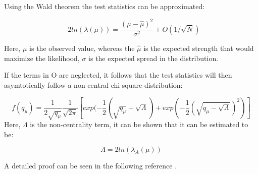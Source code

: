 Using the Wald theorem the test statistics can be approximated: 

\begin{equation}
-2ln(\lambda(\mu))= \frac{(\mu- \hat{\mu})^{2}}{\sigma^{2}} +O(1/\sqrt{N})
\label{eq:wald}
\end{equation}

Here, $\mu$ is the observed value, whereas the $\hat{\mu}$ is the expected strength that would maximize the likelihood, $\sigma$ is the expected spread in the distribution. 

If the terms in O are neglected, it follows that the test statistics will then asymtotically follow a non-central chi-square distribution: 

\begin{equation}
    f(q_{\mu}) = \frac{1}{2\sqrt{q_{\mu}}} \frac{1}{\sqrt{2\pi}} [exp(-\frac{1}{2}(\sqrt{q_{\mu}}+ \sqrt{\Lambda})+ exp(-\frac{1}{2}(\sqrt{q_{\mu}-\sqrt{\Lambda}})^{2})]
\end{equation}
Here, $\Lambda$ is the non-centrality term, it can be shown that it can be estimated to be:

\begin{equation}
    \Lambda=2ln(\lambda_{A}(\mu))
    \label{eq:Lambda}
\end{equation}

A detailed proof can be seen in the following reference \cite{2011}. 










%
%
%
%


